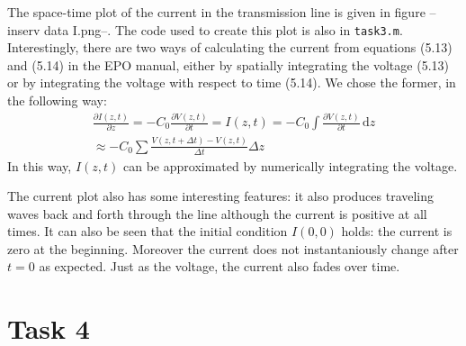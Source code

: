 \documentclass[11pt,titlepage]{report}
\begin{document}
The space-time plot of the current in the transmission line is given in figure --inserv data I.png--. The code used to create this plot is also in \texttt{task3.m}. Interestingly, there are two ways of calculating the current from equations (5.13) and (5.14) in the EPO manual, either by spatially integrating the voltage (5.13) or by integrating the voltage with respect to time (5.14). We chose the former, in the following way:
\begin{eqnarray}
\frac{\partial I(z,t)}{\partial z}=-C_0\frac{\partial V(z,t)}{\partial t} = I(z,t)=-C_0\int \! \frac{\partial V(z,t)}{\partial t}\, \mathrm{d}z \\
\approx -C_0\sum\frac{V(z,t+\Delta t)-V(z,t)}{\Delta t}\Delta z
\end{eqnarray}
In this way, $I(z,t)$ can be approximated by numerically integrating the voltage. 

The current plot also has some interesting features: it also produces traveling waves back and forth through the line although the current is positive at all times. It can also be seen that the initial condition $I(0,0)$ holds: the current is zero at the beginning. Moreover the current does not instantaniously change after $t=0$ as expected. Just as the voltage, the current also fades over time.

\section{Task 4}
\end{document}
